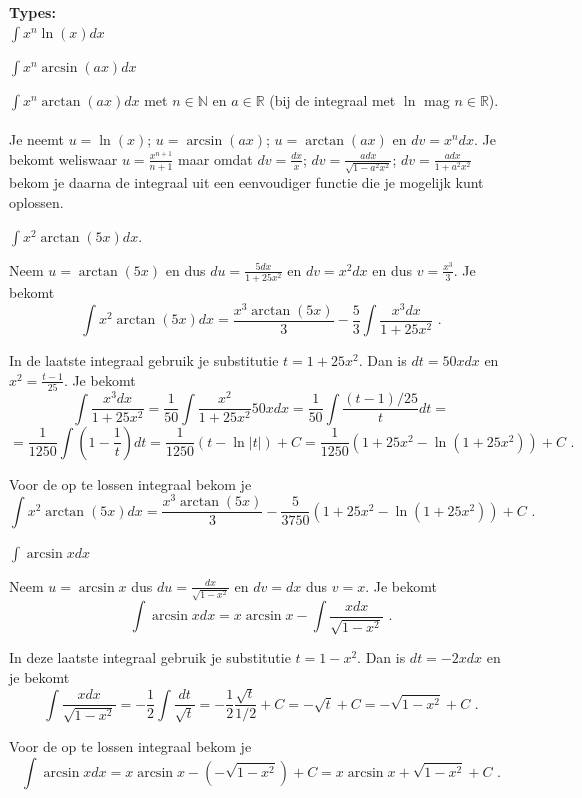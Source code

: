 \begin{ftrekenregel}
	
	\textbf{Types:}\\
	
	$\int x^n \ln (x)dx$
	
	$\int x^n \arcsin(ax)dx$
	
	$\int x^n \arctan(ax)dx$ met $n \in \mathbb{N}$ en $a \in \mathbb{R}$ (bij de integraal met $\ln$ mag $n \in \mathbb{R}$).
	\\
	\\
	Je neemt $u= \ln (x)$; $u=\arcsin (ax)$; $u=\arctan (ax)$ en $dv=x^n dx$.
	Je bekomt weliswaar $u=\frac {x^{n+1}}{n+1}$ maar omdat $dv=\frac{dx}{x}$; $dv=\frac{adx}{\sqrt{1-a^2x^2}}$; $dv=\frac {adx}{1+a^2x^2}$ bekom je daarna de integraal uit een eenvoudiger functie die je mogelijk kunt oplossen.

\end{ftrekenregel}

\begin{voorbeeld}
	
$\int x^2 \arctan(5x)dx$.

Neem $u=\arctan (5x)$ en dus $du=\frac{5dx}{1+25x^2}$ en $dv=x^2dx$ en dus $v=\frac{x^3}{3}$.
Je bekomt
\[
\int x^2 \arctan(5x)dx=\frac{x^3 \arctan (5x)}{3}-\frac{5}{3} \int \frac {x^3dx}{1+25x^2} \text { .}
\]

In de laatste integraal gebruik je substitutie $t=1+25x^2$.
Dan is $dt=50xdx$ en $x^2=\frac{t-1}{25}$.
Je bekomt
\[
\int \frac {x^3dx}{1+25x^2}=\frac{1}{50}\int \frac{x^2}{1+25x^2}50xdx=\frac{1}{50}\int \frac{(t-1)/25}{t}dt=
\]
\[
=\frac{1}{1250}\int \left( 1-\frac{1}{t}  \right)dt=\frac{1}{1250}\left(  t-\ln \vert t \vert  \right)+C=\frac{1}{1250} \left( 1+25x^2-\ln \left( 1+25x^2 \right) \right)+C \text { .}
\]

Voor de op te lossen integraal bekom je
\[
\int x^2 \arctan(5x)dx=\frac{x^3 \arctan (5x)}{3}-\frac{5}{3750} \left( 1+25x^2-\ln \left( 1+25x^2 \right) \right)+C \text { .}
\]

\end{voorbeeld}

\begin{voorbeeld}
	$\int \arcsin x dx$

Neem $u=\arcsin x$ dus $du=\frac{dx}{\sqrt {1-x^2}}$ en $dv=dx$ dus $v=x$.
Je bekomt
\[
\int \arcsin x dx=x \arcsin x-\int \frac{xdx}{\sqrt{1-x^2}} \text { .}
\]

In deze laatste integraal gebruik je substitutie $t=1-x^2$.
Dan is $dt=-2xdx$ en je bekomt
\[
\int \frac{xdx}{\sqrt{1-x^2}}=-\frac{1}{2}\int \frac{dt}{\sqrt{t}}=-\frac{1}{2}\frac{\sqrt{t}}{1/2}+C=-\sqrt{t}+C=-\sqrt{1-x^2}+C \text { .}
\]

Voor de op te lossen integraal bekom je
\[
\int \arcsin x dx=x \arcsin x-\left( -\sqrt{1-x^2}  \right)+C=x \arcsin x+\sqrt{1-x^2} +C \text { .}
\]

\end{voorbeeld}



